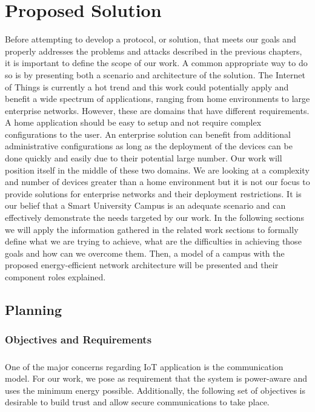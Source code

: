 
\chapter{Proposed Solution}
\label{chapter:proposed_solution}

Before attempting to develop a protocol, or solution, that meets our goals and properly addresses the problems and attacks described in the previous chapters, it is important to define the scope of our work. A common appropriate way to do so is by presenting both a scenario and architecture of the solution. The Internet of Things is currently a hot trend and this work could potentially apply and benefit a wide spectrum of applications, ranging from home environments to large enterprise networks. However, these are domains that have different requirements. A home application should be easy to setup and not require complex configurations to the user. An enterprise solution can benefit from additional administrative configurations as long as the deployment of the devices can be done quickly and easily due to their potential large number. Our work will position itself in the middle of these two domains. We are looking at a complexity and number of devices greater than a home environment but it is not our focus to provide solutions for enterprise networks and their deployment restrictions. It is our belief that a Smart University Campus is an adequate scenario and can effectively demonstrate the needs targeted by our work. In the following sections we will apply the information gathered in the related work sections to formally define what we are trying to achieve, what are the difficulties in achieving those goals and how can we overcome them. Then, a model of a campus with the proposed energy-efficient network architecture will be presented and their component roles explained. 

\section{Planning}

\subsection{Objectives and Requirements}
\paragraph{}
One of the major concerns regarding \gls{IoT} application is the communication model. For our work, we pose as requirement that the system is power-aware and uses the minimum energy possible. Additionally, the following set of objectives is desirable to build trust and allow secure communications to take place.

